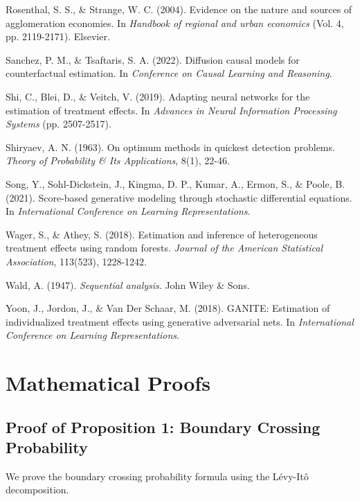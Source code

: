 \begin{thebibliography}{99}
Rosenthal, S. S., \& Strange, W. C. (2004). Evidence on the nature and sources of agglomeration economies. In \textit{Handbook of regional and urban economics} (Vol. 4, pp. 2119-2171). Elsevier.

Sanchez, P. M., \& Tsaftaris, S. A. (2022). Diffusion causal models for counterfactual estimation. In \textit{Conference on Causal Learning and Reasoning}.

Shi, C., Blei, D., \& Veitch, V. (2019). Adapting neural networks for the estimation of treatment effects. In \textit{Advances in Neural Information Processing Systems} (pp. 2507-2517).

Shiryaev, A. N. (1963). On optimum methods in quickest detection problems. \textit{Theory of Probability \& Its Applications}, 8(1), 22-46.

Song, Y., Sohl-Dickstein, J., Kingma, D. P., Kumar, A., Ermon, S., \& Poole, B. (2021). Score-based generative modeling through stochastic differential equations. In \textit{International Conference on Learning Representations}.

Wager, S., \& Athey, S. (2018). Estimation and inference of heterogeneous treatment effects using random forests. \textit{Journal of the American Statistical Association}, 113(523), 1228-1242.

Wald, A. (1947). \textit{Sequential analysis}. John Wiley \& Sons.

Yoon, J., Jordon, J., \& Van Der Schaar, M. (2018). GANITE: Estimation of individualized treatment effects using generative adversarial nets. In \textit{International Conference on Learning Representations}.

\end{thebibliography}

\appendix

\section{Mathematical Proofs}

\subsection{Proof of Proposition 1: Boundary Crossing Probability}

We prove the boundary crossing probability formula using the L\'evy-It\^o decomposition.

